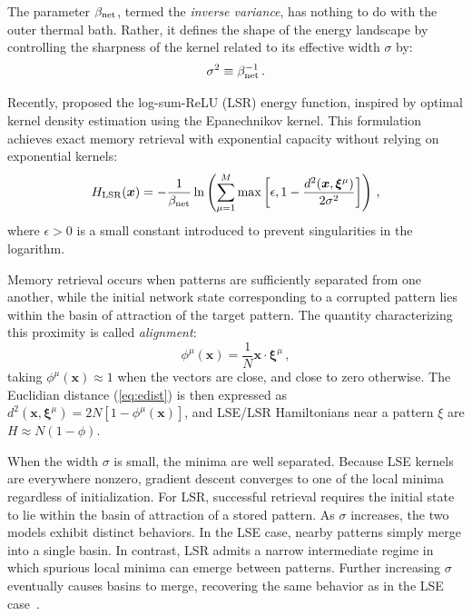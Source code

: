 \documentclass{article}
\theoremstyle{plain}
\theoremstyle{definition}
\theoremstyle{remark}
\begin{document}
The parameter $\beta_{\rm net}$, termed the {\it inverse variance}, has nothing to do with the outer thermal bath. Rather, it defines the shape of the energy landscape by controlling the sharpness of the kernel related to its effective width $\sigma$ by:
\begin{equation}
    \sigma^2 \equiv \beta_{\rm net}^{-1} \,.
\end{equation}

Recently, \citet{hoover2025dense} proposed the log-sum-ReLU (LSR) energy function, inspired by optimal kernel density estimation using the Epanechnikov kernel. This formulation achieves exact memory retrieval with exponential capacity without relying on exponential kernels:
\begin{equation}
    H_{\rm LSR}(\bm{x}) = -\frac{1}{\beta_{\rm net}} \ln \left( \sum_{\mu=1}^M \max\left[\epsilon,  1 - \frac{d^2(\bm{x},\bm{\xi}^\mu)}{2\sigma^2} \right] \right) \,,
    \label{eq:H_lsr}
\end{equation}
where $\epsilon > 0$ is a small constant introduced to prevent singularities in the logarithm.

Memory retrieval occurs when patterns are sufficiently separated from one another, while the initial network state corresponding to a corrupted pattern lies within the basin of attraction of the target pattern. The quantity characterizing this proximity is called \textit{alignment}:
\begin{equation}
    \phi^\mu(\bm{x}) = \frac{1}{N} \bm{x} \cdot \bm{\xi}^\mu\,,
    \label{eq:alignment}
\end{equation}
taking $\phi^\mu(\bm{x}) \approx 1$ when the vectors are close, and close to zero otherwise. The Euclidian distance (\ref{eq:edist}) is then expressed as $d^2(\bm{x}, \bm{\xi}^\mu) =2N [1- \phi^\mu(\bm{x}) ]$, and 
LSE/LSR Hamiltonians near a pattern $\xi$ are $H\approx N(1-\phi)$.

When the width $\sigma$ is small, the minima are well separated. Because LSE kernels are everywhere nonzero, gradient descent converges to one of the local minima regardless of initialization. For LSR, successful retrieval requires the initial state to lie within the basin of attraction of a stored pattern. As $\sigma$ increases, the two models exhibit distinct behaviors. In the LSE case, nearby patterns simply merge into a single basin. In contrast, LSR admits a narrow intermediate regime in which spurious local minima can emerge between patterns. Further increasing $\sigma$ eventually causes basins to merge, recovering the same behavior as in the LSE case~\cite{hoover2025dense}.
\end{document}
